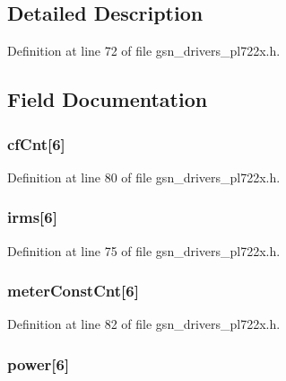 \subsection{Detailed Description}


Definition at line 72 of file gsn\_\-drivers\_\-pl722x.h.



\subsection{Field Documentation}
\hypertarget{a00453_a03546b6ccb71deddb4051ae3bcf18c71}{
\subsubsection[{cfCnt}]{ {\bf cfCnt}\mbox{[}6\mbox{]}}}
\label{a00453_a03546b6ccb71deddb4051ae3bcf18c71}


Definition at line 80 of file gsn\_\-drivers\_\-pl722x.h.

\hypertarget{a00453_aa18ebfa1e0ebb47331630a63a2d6e657}{
\subsubsection[{irms}]{ {\bf irms}\mbox{[}6\mbox{]}}}
\label{a00453_aa18ebfa1e0ebb47331630a63a2d6e657}


Definition at line 75 of file gsn\_\-drivers\_\-pl722x.h.

\hypertarget{a00453_a9845b577b1bea115b200659a0ebfa3fe}{
\subsubsection[{meterConstCnt}]{ {\bf meterConstCnt}\mbox{[}6\mbox{]}}}
\label{a00453_a9845b577b1bea115b200659a0ebfa3fe}


Definition at line 82 of file gsn\_\-drivers\_\-pl722x.h.

\hypertarget{a00453_a1a369ad376c8f149942f3dca79d7a0fa}{
\subsubsection[{power}]{ {\bf power}\mbox{[}6\mbox{]}}}
\label{a00453_a1a369ad376c8f149942f3dca79d7a0fa}


